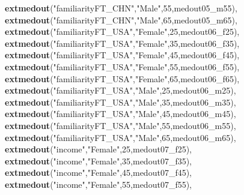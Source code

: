 \documentclass[
]{article}
\newenvironment{Shaded}{\begin{snugshade}}{\end{snugshade}}
\newcommand{\DecValTok}[1]{\textcolor[rgb]{0.00,0.00,0.81}{#1}}
\newcommand{\KeywordTok}[1]{\textcolor[rgb]{0.13,0.29,0.53}{\textbf{#1}}}
\newcommand{\NormalTok}[1]{#1}
\newcommand{\StringTok}[1]{\textcolor[rgb]{0.31,0.60,0.02}{#1}}
\begin{document}
\begin{Shaded}
\begin{Highlighting}[]
                  \KeywordTok{extmedout}\NormalTok{(}\StringTok{"familiarityFT_CHN"}\NormalTok{,}\StringTok{"Male"}\NormalTok{,}\DecValTok{55}\NormalTok{,medout05_m55),}
                  \KeywordTok{extmedout}\NormalTok{(}\StringTok{"familiarityFT_CHN"}\NormalTok{,}\StringTok{"Male"}\NormalTok{,}\DecValTok{65}\NormalTok{,medout05_m65),}
                  \KeywordTok{extmedout}\NormalTok{(}\StringTok{"familiarityFT_USA"}\NormalTok{,}\StringTok{"Female"}\NormalTok{,}\DecValTok{25}\NormalTok{,medout06_f25),}
                  \KeywordTok{extmedout}\NormalTok{(}\StringTok{"familiarityFT_USA"}\NormalTok{,}\StringTok{"Female"}\NormalTok{,}\DecValTok{35}\NormalTok{,medout06_f35),}
                  \KeywordTok{extmedout}\NormalTok{(}\StringTok{"familiarityFT_USA"}\NormalTok{,}\StringTok{"Female"}\NormalTok{,}\DecValTok{45}\NormalTok{,medout06_f45),}
                  \KeywordTok{extmedout}\NormalTok{(}\StringTok{"familiarityFT_USA"}\NormalTok{,}\StringTok{"Female"}\NormalTok{,}\DecValTok{55}\NormalTok{,medout06_f55),}
                  \KeywordTok{extmedout}\NormalTok{(}\StringTok{"familiarityFT_USA"}\NormalTok{,}\StringTok{"Female"}\NormalTok{,}\DecValTok{65}\NormalTok{,medout06_f65),}
                  \KeywordTok{extmedout}\NormalTok{(}\StringTok{"familiarityFT_USA"}\NormalTok{,}\StringTok{"Male"}\NormalTok{,}\DecValTok{25}\NormalTok{,medout06_m25),}
                  \KeywordTok{extmedout}\NormalTok{(}\StringTok{"familiarityFT_USA"}\NormalTok{,}\StringTok{"Male"}\NormalTok{,}\DecValTok{35}\NormalTok{,medout06_m35),}
                  \KeywordTok{extmedout}\NormalTok{(}\StringTok{"familiarityFT_USA"}\NormalTok{,}\StringTok{"Male"}\NormalTok{,}\DecValTok{45}\NormalTok{,medout06_m45),}
                  \KeywordTok{extmedout}\NormalTok{(}\StringTok{"familiarityFT_USA"}\NormalTok{,}\StringTok{"Male"}\NormalTok{,}\DecValTok{55}\NormalTok{,medout06_m55),}
                  \KeywordTok{extmedout}\NormalTok{(}\StringTok{"familiarityFT_USA"}\NormalTok{,}\StringTok{"Male"}\NormalTok{,}\DecValTok{65}\NormalTok{,medout06_m65),}
                  \KeywordTok{extmedout}\NormalTok{(}\StringTok{"income"}\NormalTok{,}\StringTok{"Female"}\NormalTok{,}\DecValTok{25}\NormalTok{,medout07_f25),}
                  \KeywordTok{extmedout}\NormalTok{(}\StringTok{"income"}\NormalTok{,}\StringTok{"Female"}\NormalTok{,}\DecValTok{35}\NormalTok{,medout07_f35),}
                  \KeywordTok{extmedout}\NormalTok{(}\StringTok{"income"}\NormalTok{,}\StringTok{"Female"}\NormalTok{,}\DecValTok{45}\NormalTok{,medout07_f45),}
                  \KeywordTok{extmedout}\NormalTok{(}\StringTok{"income"}\NormalTok{,}\StringTok{"Female"}\NormalTok{,}\DecValTok{55}\NormalTok{,medout07_f55),}

\end{Highlighting}
\end{Shaded}
\end{document}
